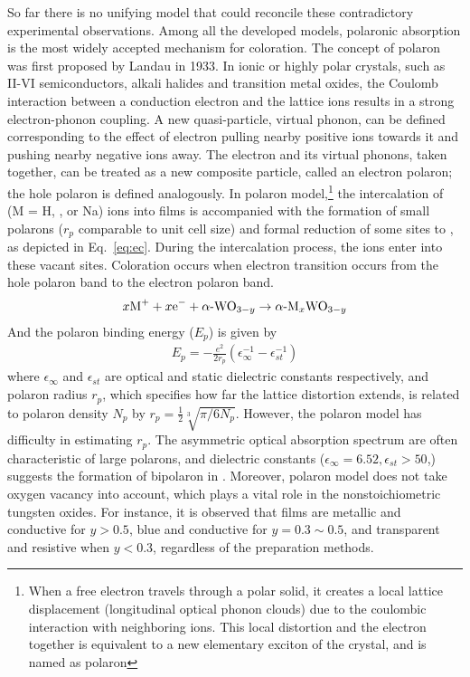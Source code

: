 So far there is no unifying model that could reconcile these contradictory experimental observations. Among all the developed models, polaronic absorption is the most widely accepted mechanism for coloration. The concept of polaron was first proposed by Landau in 1933. In ionic or highly polar crystals, such as II-VI semiconductors, alkali halides and transition metal oxides, the Coulomb interaction between a conduction electron and the lattice ions results in a strong electron-phonon coupling. A new quasi-particle, virtual phonon, can be defined corresponding to the effect of electron pulling nearby positive ions towards it and pushing nearby negative ions away. The electron and its virtual phonons, taken together, can be treated as a new composite particle, called an electron polaron; the hole polaron is defined analogously.\cite{Devreese1996} In polaron model,\footnote{When a free electron travels through a polar solid, it creates a local lattice displacement (longitudinal optical phonon clouds) due to the coulombic interaction with neighboring ions. This local distortion and the electron together is equivalent to a new elementary exciton of the crystal, and is named as polaron} the intercalation of  (M = H, , or Na) ions into  films is accompanied with the formation of small polarons ($r_p$ comparable to unit cell size) and formal reduction of some  sites to , as depicted in Eq.~\ref{eq:ec}. During the intercalation process, the  ions enter into these vacant sites.\cite{Hepel2008} Coloration occurs when electron transition occurs from the hole polaron band to the electron polaron band.
\begin{align}\label{eq:ec}
x\ce{M+} + x\ce{e-} +  \ce{$\alpha \hyphen$WO$_{3-y}$} \rightarrow \ce{$\alpha \hyphen$M$_x$WO$_{3-y}$}
\end{align}
And the polaron binding energy ($E_p$) is given by
\begin{align}
E_p = - \frac{e^2}{2r_p} (\epsilon_\infty^{-1} - \epsilon_{st}^{-1})
\end{align}
where $\epsilon_\infty$ and $\epsilon_{st}$ are optical and static dielectric constants respectively, and polaron radius $r_p$, which specifies how far the lattice distortion extends, is related to polaron density $N_p$ by $r_p = \frac{1}{2}\sqrt[3]{\pi/6N_p}$. However, the polaron model has difficulty in estimating $r_p$. The asymmetric optical absorption spectrum are often characteristic of large polarons, and dielectric constants ($\epsilon_\infty = 6.52,\epsilon_{st} > 50$,\cite{Deb2008}) suggests the formation of bipolaron in . Moreover, polaron model does not take oxygen vacancy into account, which plays a vital role in the nonstoichiometric tungsten oxides. For instance, it is observed that  films are metallic and conductive for $y > 0.5$, blue and conductive for $y = 0.3 \sim 0.5$, and transparent and resistive when $y < 0.3$, regardless of the preparation methods.\cite{Chatten2005}

